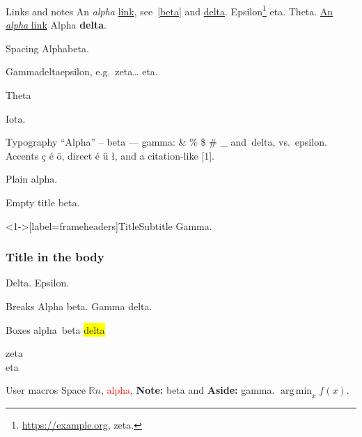 \documentclass{beamer}
\newcommand{\R}{\mathbb{R}}
\newcommand{\highlight}[1]{\textcolor{red}{#1}}
\newcommand{\remark}[2][Note]{\textbf{#1:} #2}
\DeclareMathOperator*{\argmin}{arg\,min}
\begin{document}
\begin{frame}{Links and notes}
An \emph{alpha} \href{https://example.org}{link}, see~\ref{beta} and \hyperlink{gamma}{delta}.
Epsilon\footnote{\url{https://example.org}, zeta.} eta.
\hypertarget<2>{gamma}{Theta.}
\href{https://example.org}{An \emph{alpha} link}
Alpha \textbf<1>{delta}.
\end{frame}

\begin{frame}{Spacing}
\vspace{-8pt}
Alpha\hfill{}beta.
\medskip

Gamma\hspace*{1em}delta\quad epsilon, e.g.\ zeta\ldots{} eta.
\bigskip
\vfill
\centerline{Theta}
\begin{center}
\small Iota.
\end{center}
\end{frame}

\begin{frame}{Typography}
``Alpha'' -- beta --- gamma: \& \% \$ \# \_ and~delta, vs.\ epsilon.
Accents \c{c} \'e \"o, direct é ü ł, and a citation-like [1].
\end{frame}

\begin{frame}[plain]
Plain alpha.
\end{frame}

\begin{frame}{}
Empty title beta.
\end{frame}

\begin{frame}<1->[label=frameheaders]{Title}{Subtitle}
Gamma.
\end{frame}

\begin{frame}
\frametitle{Title in the body}
Delta.
\pause
Epsilon.
\end{frame}

\begin{frame}[allowframebreaks]{Breaks}
Alpha beta.
\framebreak
Gamma delta.
\end{frame}

\begin{frame}{Boxes}
\mbox{alpha beta}  \colorbox{yellow}{delta} 
\parbox{4em}{zeta\\ eta}   
\end{frame}

\begin{frame}{User macros}
Space $\R n$, \highlight{alpha}, \remark{beta} and \remark[Aside]{gamma}.
$\argmin_x f(x)$.
\end{frame}
\end{document}
